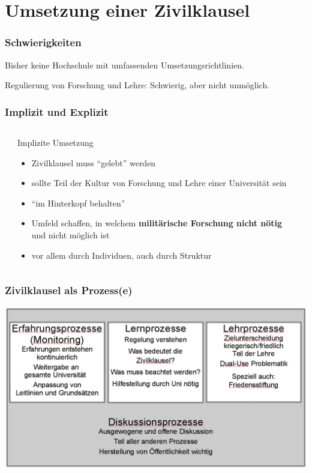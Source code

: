 \documentclass[presentation]{beamer}
\providecommand{\alert}[1]{\textbf{#1}}
\begin{document}
\section{Umsetzung einer Zivilklausel}
\label{sec-4}
\begin{frame}
\frametitle{Schwierigkeiten}
\label{sec-4-1}

Bisher keine Hochschule mit umfassenden Umsetzungsrichtlinien.

\vspace{0.7cm}

Regulierung von Forschung und Lehre: Schwierig, aber nicht unmöglich.
\end{frame}
\begin{frame}
\frametitle{Implizit und Explizit}
\label{sec-4-2}
\begin{columns} %
\label{sec-4-2-1}
\begin{column}{0.48\textwidth}
\begin{block}{Implizite Umsetzung}
\label{sec-4-2-1-1}

\fontsize{10pt}{12}\selectfont
\begin{itemize}
\item Zivilklausel muss ``gelebt'' werden
\item sollte Teil der Kultur von Forschung und Lehre einer Universität sein
\item ``im Hinterkopf behalten''
\item Umfeld schaffen, in welchem \alert{militärische Forschung nicht nötig} und nicht möglich ist
\item vor allem durch Individuen, auch durch Struktur
\end{itemize}
\end{block}
\end{column}
\begin{column}{0.48\textwidth}
\label{sec-4-2-1-2}
\end{column}
\end{columns}
\end{frame}
\begin{frame}
\frametitle{Zivilklausel als Prozess(e)}
\label{sec-4-3}

\includegraphics[width=\textwidth]{./prozesse2.png}
\end{frame}
\end{document}
